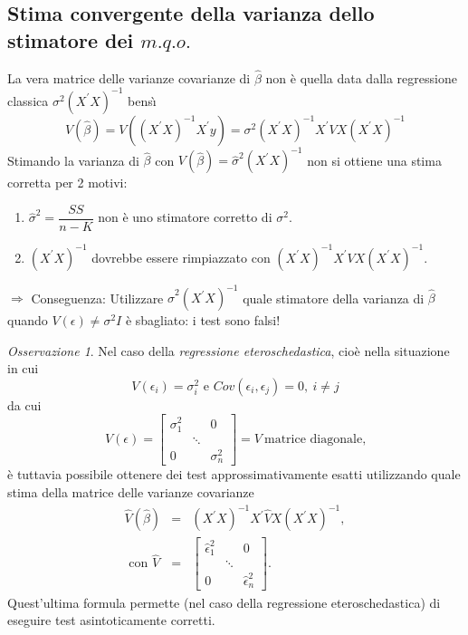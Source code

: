 \documentclass[a4paper]{report}
\newcounter{ese}
\theoremstyle{remark}
\newtheorem{remark}{Osservazione}
\newcounter{theor}
\begin{document}
\subsection{Stima convergente della varianza dello stimatore dei $m.q.o.$}

La vera matrice delle varianze covarianze di $\hat{\beta}$ non \`{e} quella
data dalla regressione classica $\sigma ^{2}(X^{\prime }X)^{-1}$ bens\`{\i} 
\begin{equation}
V(\hat{\beta})=V((X^{\prime }X)^{-1}X^{\prime }y)=\sigma ^{2}(X^{\prime
}X)^{-1}X^{\prime }VX(X^{\prime }X)^{-1}
\end{equation}%
Stimando la varianza di $\hat{\beta}$ con $V(\hat{\beta})=\hat{\sigma}%
^{2}(X^{\prime }X)^{-1}$ non si ottiene una stima corretta per 2 motivi:

\begin{enumerate}
\item $\hat{\sigma}^{2}=\dfrac{SS}{n-K}$ non \`{e} uno stimatore corretto di 
$\sigma ^{2}$.

\item $(X^{\prime }X)^{-1}$ dovrebbe essere rimpiazzato con $(X^{\prime
}X)^{-1}X^{\prime }VX(X^{\prime }X)^{-1}$.
\end{enumerate}

\noindent $\Rightarrow $ Conseguenza: Utilizzare $\hat{\sigma}^{2}(X^{\prime
}X)^{-1}$ quale stimatore della varianza di $\hat{\beta}$ quando $V(\epsilon
)\neq \sigma ^{2}I$ \`{e} sbagliato: i test sono falsi!

\begin{remark}
Nel caso della \emph{regressione eteroschedastica}, cio\`{e} nella
situazione in cui 
\begin{equation*}
V(\epsilon _{i})=\sigma _{i}^{2}\text{ e }Cov(\epsilon _{i},\epsilon
_{j})=0,\ i\neq j
\end{equation*}%
da cui 
\begin{equation*}
V(\epsilon )=\left[ 
\begin{array}{ccc}
\sigma _{1}^{2} &  & 0 \\ 
& \ddots &  \\ 
0 &  & \sigma _{n}^{2}%
\end{array}%
\right] =V\ \text{matrice diagonale,}
\end{equation*}%
\`{e} tuttavia possibile ottenere dei test approssimativamente esatti
utilizzando quale stima della matrice delle varianze covarianze 
\begin{eqnarray*}
\hat{V}(\hat{\beta}) &=&(X^{\prime }X)^{-1}X^{\prime }\hat{V}X(X^{\prime
}X)^{-1}, \\
\text{ con }\hat{V} &=&\left[ 
\begin{array}{ccc}
\hat{\epsilon}_{1}^{2} &  & 0 \\ 
& \ddots &  \\ 
0 &  & \hat{\epsilon}_{n}^{2}%
\end{array}%
\right] .
\end{eqnarray*}%
Quest'ultima formula permette (nel caso della regressione eteroschedastica)
di eseguire test asintoticamente corretti.
\end{remark}
\end{document}
